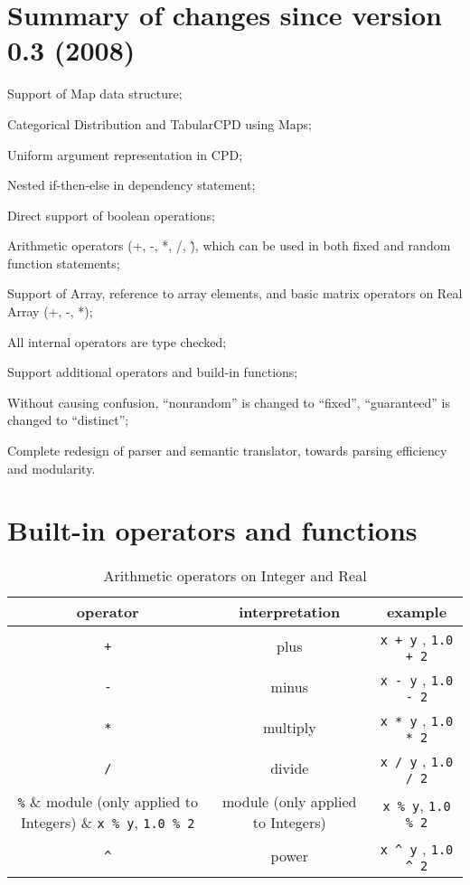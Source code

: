 \documentclass[12pt]{article}
\begin{document}
\appendix

\section{Summary of changes since version 0.3 (2008)}
\begin{itemize*}
\item Support of Map data structure;
\item Categorical Distribution and TabularCPD using Maps;
\item Uniform argument representation in CPD;
\item Nested if-then-else in dependency statement;
\item Direct support of boolean operations;
\item Arithmetic operators (+, -, *, /, \^), which can be used in both fixed and random function statements;
\item Support of Array, reference to array elements, and basic matrix operators on Real Array (+, -, *);
\item All internal operators are type checked;
\item Support additional operators and build-in functions; 
\item Without causing confusion, ``nonrandom'' is changed to ``fixed'', ``guaranteed'' is changed to ``distinct'';
\item Complete redesign of parser and semantic translator, towards parsing efficiency and modularity.
\end{itemize*}

\section{Built-in operators and functions}
\begin{table}[h]
\centering
\caption{Arithmetic operators on Integer and Real}
\begin{tabular}{ c c c }
\toprule 
operator & interpretation & example \\
\midrule
\verb|+| & plus & \verb|x + y| , \verb|1.0 + 2|\\ 
\verb|-| & minus & \verb|x - y| , \verb|1.0 - 2|\\ 
\verb|*| & multiply & \verb|x * y| , \verb|1.0 * 2|\\
\verb|/| & divide & \verb|x / y| , \verb|1.0 / 2|\\ 
\verb|%| & module (only applied to Integers) & \verb|x % y|, \verb|1.0 % 2| \\
\verb|^| & power & \verb|x ^ y| , \verb|1.0 ^ 2| \\
\bottomrule
\end{tabular}
\end{table}
\end{document}
